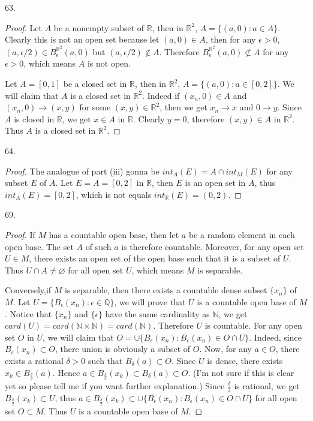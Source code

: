 \documentclass[12pt, a4paper]{article}
\theoremstyle{plain}
\newcommand{\N}{\mathbb{N}}
\newcommand{\Q}{\mathbb{Q}}
\newcommand{\R}{\mathbb{R}}
\begin{document}
63.
\begin{proof}
Let $A$ be a nonempty subset of $\R$, then in $\R^2$, $A=\{(a,0):a\in A\}$. Clearly this is not an open set because let $(a,0)\in A$, then for any $\epsilon>0$, $(a,\epsilon/2)\in B_\epsilon^{\R^2}(a,0)$ but $(a,\epsilon/2)\notin A$. Therefore $B_\epsilon^{\R^2}(a,0)\not\subset A$ for any $\epsilon>0$, which means $A$ is not open.

Let $A=[0,1]$ be a closed set in $\R$, then in $\R^2$, $A=\{(a,0):a\in [0,2]\}$. We will claim that $A$ is a closed set in $\R^2$. Indeed if $(x_n,0)\in A$ and $(x_n,0)\rightarrow (x,y)$ for some $(x,y)\in \R^2$, then we get $x_n\rightarrow x$ and $0\rightarrow y$. Since $A$ is closed in $\R$, we get $x\in A$ in $\R$. Clearly $y=0$, therefore $(x,y)\in A$ in $\R^2$. Thus $A$ is a closed set in $\R^2$.
\end{proof}

64.
\begin{proof}
The analogue of part (iii) gonna be $int_A(E)=A\cap int_M(E)$ for any subset $E$ of $A$. Let $E=A=[0,2]$ in $\R$, then $E$ is an open set in $A$, thus $int_A(E)=[0,2]$, which is not equals $int_\R(E)=(0,2)$.
\end{proof}

69.
\begin{proof}
If $M$ has a countable open base, then let $a$ be a random element in each open base. The set $A$ of such $a$ is therefore countable. Moreover, for any open set $U\in M$, there exists an open set of the open base such that it is a subset of $U$. Thus $U\cap A\neq\varnothing$ for all open set $U$, which means $M$ is separable.

Conversely,if $M$ is separable, then there exists a countable dense subset $\{x_n\}$ of $M$. Let $U=\{B_\epsilon(x_n):\epsilon\in\Q\}$, we will prove that $U$ is a countable open base of $M$. Notice that $\{x_n\}$ and $\{\epsilon\}$ have the same cardinality as $\N$, we get $card(U)=card(\N\times \N)=card(\N)$. Therefore $U$ is countable. For any open set $O$ in $U$, we will claim that $O=\cup\{B_\epsilon(x_n):B_\epsilon(x_n)\in O\cap U\}$. Indeed, since $B_\epsilon(x_n)\subset O$, there union is obviously a subset of $O$. Now, for any $a\in O$, there exists a rational $\delta>0$ such that $B_\delta(a)\subset O$. Since $U$ is dense, there exists $x_k\in B_\frac{\delta}{2}(a)$. Hence $a\in B_\frac{\delta}{2}(x_k)\subset B_\delta(a)\subset O$. (I'm not sure if this is clear yet so please tell me if you want further explanation.) Since $\frac{\delta}{2}$ is rational, we get $B_\frac{\delta}{2}(x_k)\subset U$, thus $a\in B_ \frac{\delta}{2}(x_k)\subset \cup\{B_\epsilon(x_n):B_\epsilon(x_n)\in O\cap U\}$ for all open set $O\subset M$. Thus $U$ is a countable open base of $M$.
\end{proof}
\end{document}

